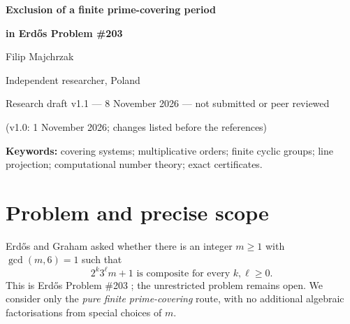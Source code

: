\documentclass[11pt,a4paper]{article}
\newcommand{\lcm}{\operatorname{lcm}}
\begin{document}
\begin{center}
{\color{ink}\LARGE\bfseries Exclusion of a finite prime-covering period\par}
\vspace{0.17em}
{\color{ink}\LARGE\bfseries in Erd\H{o}s Problem \#203}\par
\vspace{0.65em}
{\large Filip Majchrzak}\par
{\small Independent researcher, Poland}\par
\vspace{0.4em}
{\color{accent}\small Research draft v1.1 --- 8 November 2026 --- not submitted or peer reviewed}\par
{\small\color{muted} (v1.0: 1 November 2026; changes listed before the references)}\par
\end{center}

\begin{abstract}
Erd\H{o}s Problem \#203 asks whether some positive integer $m$, coprime to $6$, makes every $2^k3^\ell m+1$ composite for $k,\ell\ge 0$. We rule out a specific finite-prime-covering approach: no \emph{pure} covering by prime-divisibility cosets has covering period dividing $N=\lcm(1,\ldots,17)=12\,252\,240$. A complete computation of the relevant prime pool gives 192 distinct primes. Combining the known slope-one line-projection method with explicitly specified nonnegative weights on residue classes modulo $60$ yields the exact upper bound
$3\,961\,943/4\,084\,080<1$, contradicting the intensity required by a covering. The result extends immediately to all $480$ divisors of $N$ by inclusion of prime pools; $411$ of these periods were excluded in earlier work, and to our knowledge the other $69$ had not been excluded before. Exact-arithmetic verifiers, including a GMP recomputation of the 2,432-bit pool gcd, are publicly archived, and the pool and the bound have been reproduced by Erd\H{o}s Problem a Day, a separate project (private communication). A rational linear-programming dual certificate additionally proves optimality of the weights \emph{within this fixed cut and modulus}. The full Erd\H{o}s problem remains open.
\end{abstract}

\noindent\textbf{Keywords:} covering systems; multiplicative orders; finite cyclic groups; line projection; computational number theory; exact certificates.

\section{Problem and precise scope}
Erd\H{o}s and Graham asked whether there is an integer $m\ge1$ with $\gcd(m,6)=1$ such that
\begin{equation}\label{eq:erdos}
  2^k3^\ell m+1\text{ is composite for every } k,\ell\ge0.
\end{equation}
This is Erd\H{o}s Problem \#203 \cite{ErdosGraham,Bloom203}; the unrestricted problem remains open. We consider only the \emph{pure finite prime-covering} route, with no additional algebraic factorisations from special choices of $m$.
\end{document}
